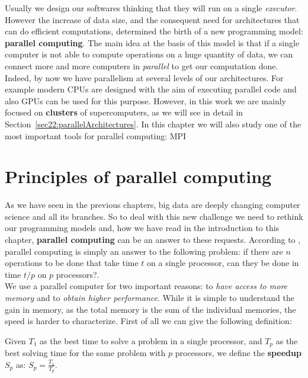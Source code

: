 Usually we design our softwares thinking that they will run on a single \textit{executor}. However the increase of data size, and the consequent need for architectures that can do efficient computations, determined the birth of a new programming model: \textbf{parallel computing}. The main idea at the basis of this model is that if a single computer is not able to compute operations on a huge quantity of data, we can connect more and more computers in \textit{parallel} to get our computation done. Indeed, by now we have parallelism at several levels of our architectures. For example modern CPUs are designed with the aim of executing parallel code and also GPUs can be used for this purpose. However, in this work we are mainly focused on \textbf{clusters} of supercomputers, as we will see in detail in Section~\ref{sec22:parallelArchitectures}. In this chapter we will also study one of the most important tools for parallel computing: MPI

\section{Principles of parallel computing}\label{sec22:parallelComputing}

As we have seen in the previous chapters, big data are deeply changing computer science and all its branches. So to deal with this new challenge we need to rethink our programming models and, how we have read in the introduction to this chapter, \textbf{parallel computing} can be an answer to these requests. According to \cite{Eijkhout}, parallel computing is simply an answer to the following problem: if there are $n$ operations to be done that take time $t$ on a single processor, can they be done in time $t/p$ on $p$ processors?.\\

We use a parallel computer for two important reasons: to \textit{have access to more memory} and to \textit{obtain higher performance}. While it is simple to understand the gain in memory, as the total memory is the sum of the individual memories, the speed is harder to characterize. First of all we can give the following definition:

\begin{definition}[Speedup]
 Given $T_{1}$ as the best time to solve a problem in a single processor, and $T_{p}$ as the best solving time for the same problem with $p$ processors, we define the \textbf{speedup} $S_{p}$ as: $S_{p} = \displaystyle\frac{T_{1}}{T_{p}}$. 
\end{definition}

